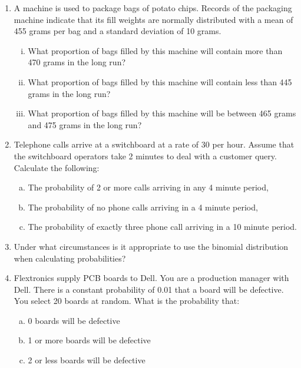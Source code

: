 \documentclass[a4paper,12pt]{article}
\begin{document}
\begin{enumerate}

\item 
A machine is used to package bags of potato chips.  Records of the packaging machine indicate that its fill weights are normally distributed with a mean of 455 grams per bag and a standard deviation of 10 grams.

    \begin{enumerate}[(i)]
    \item  What proportion of bags filled by this machine will contain more than 470 grams in the long run?
    \item What proportion of bags filled by this machine will contain less than 445 grams in the long run?
    \item What proportion of bags filled by this machine will be between 465 grams and 475 grams in the long run?
    \end{enumerate}
    
    
\item 
Telephone calls arrive at a switchboard at a rate of 30 per hour.  Assume that the switchboard operators take 2 minutes to deal with a customer query. Calculate the following:

\begin{enumerate}[(a)]
\item The probability of 2 or more calls arriving in any 4 minute period,
\item  The probability of no phone calls arriving in a 4 minute period,
\item  The probability of exactly three phone call arriving in a 10 minute period.
\end{enumerate}



\item Under what circumstances is it appropriate to use the binomial distribution when calculating probabilities?				

\item 	Flextronics supply PCB boards to Dell.  You are a production manager with Dell.  There is a constant probability of 0.01 that a board will be defective.  You select 20 boards at random.  What is the probability that:

\begin{enumerate}[(a)]
\item 	0 boards will be defective
\item	1 or more boards will be defective
\item	2 or less boards will be defective			
\end{enumerate}


\end{enumerate}
\end{document}
